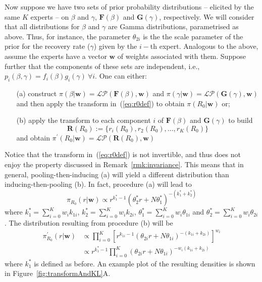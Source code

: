 \documentclass[11pt]{article}
\begin{document}
Now suppose we have two sets of prior probability distributions -- elicited by the same $K$ experts -- on $\beta$ and $\gamma$, $\mathbf{F}(\beta)$ and $\mathbf{G}(\gamma)$, respectively.
We will consider that all distributions for $\beta$ and $\gamma$ are Gamma distributions, parametrised as above.
Thus, for instance, the parameter $\theta_{2i}$ is the the scale parameter of the prior for the recovery rate ($\gamma$) given by the $i-$th expert.
Analogous to the above, assume the experts have a vector $\mathbf{w}$ of weights associated with them.
Suppose further that the components of these sets are independent, i.e., $p_i(\beta, \gamma) = f_i(\beta)g_i(\gamma)\: \forall i$.
One can either:
\begin{itemize}
 \item[(a)] construct $\pi(\beta | \mathbf{w}) = \mathcal{LP}(\mathbf{F}(\beta), \mathbf{w})$ and $\pi(\gamma | \mathbf{w}) = \mathcal{LP}(\mathbf{G}(\gamma), \mathbf{w})$ and then apply the transform in~(\ref{eq:r0def}) to obtain $\pi(R_0| \mathbf{w})$ or;
 \item[(b)] apply the transform to each component $i$ of $\mathbf{F}(\beta)$ and $\mathbf{G}(\gamma)$ to build
 \[\mathbf{R}(R_0):= \{r_i(R_0), r_2(R_0), \ldots, r_K(R_0)\} \]
 and obtain $\pi^{\prime}(R_0|  \mathbf{w}) = \mathcal{LP}(\mathbf{R}(R_0),  \mathbf{w})$
\end{itemize}
Notice that the transform in~(\ref{eq:r0def}) is not invertible, and thus does not enjoy the property discussed in Remark~\ref{rmk:invariance}.
This means that in general, pooling-then-inducing (a) will yield a different distribution than inducing-then-pooling (b).
In fact, procedure (a) will lead to
\begin{equation}
 \pi_{R_0}(r| \mathbf{w}) \propto   r^{k_{1}^{\ast}-1} (\theta_{2}^{\ast} r + N\theta_{1}^{\ast})^{-(k_{1}^{\ast} + k_{2}^{\ast})}
\end{equation}
where $k_{1}^{\ast} = \sum_{i=0}^K w_ik_{1i}$,  $k_{2}^{\ast} = \sum_{i=0}^K w_ik_{2i}$,  $\theta_{1}^{\ast} = \sum_{i=0}^K w_i\theta_{1i}$ and  $\theta_{2}^{\ast} = \sum_{i=0}^K w_i\theta_{2i}$.
The distribution resulting from procedure (b) will be 
\begin{align}
  \pi^{\prime}_{R_0}(r| \mathbf{w}) &\propto   \prod_{i=0}^K \left[ r^{k_{1i}-1} (\theta_{2i} r + N\theta_{1i})^{-(k_{1i} + k_{2i})} \right]^{w_i} \\
   &\propto r^{k_{1}^{\ast}-1}  \prod_{i=0}^K (\theta_{2i} r + N\theta_{1i})^{-w_{i}(k_{1i} + k_{2i})}
\end{align}
where $k_{1}^{\ast}$ is defined as before.
An example plot of the resulting densities is shown in Figure~\ref{fig:transformAndKL}A.
\end{document}
